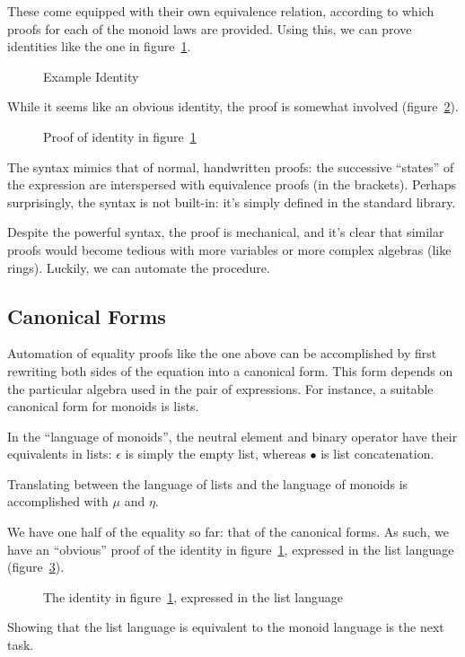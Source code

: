 \documentclass[draft, twocolumn]{article}
\begin{document}
These come equipped with their own equivalence relation, according to which
proofs for each of the monoid laws are provided. Using this, we can prove
identities like the one in figure~\ref{mon-ident}.
\begin{figure}[h]
  \caption{Example Identity}
  \label{mon-ident}
\end{figure}

While it seems like an obvious identity, the proof is somewhat involved
(figure~\ref{mon-proof}).
\begin{figure}[!h]
  \caption{Proof of identity in figure~\ref{mon-ident}}
  \label{mon-proof}
\end{figure}

The syntax mimics that of normal, handwritten proofs: the successive ``states''
of the expression are interspersed with equivalence proofs (in the brackets).
Perhaps surprisingly, the syntax is not built-in: it's simply defined in the
standard library.

Despite the powerful syntax, the proof is mechanical, and it's clear that
similar proofs would become tedious with more variables or more complex algebras
(like rings). Luckily, we can automate the procedure.
\subsection{Canonical Forms}
Automation of equality proofs like the one above can be accomplished by first
rewriting both sides of the equation into a canonical form. This form depends on
the particular algebra used in the pair of expressions. For instance, a suitable
canonical form for monoids is lists.

In the ``language of monoids'', the neutral element and binary operator have
their equivalents in lists: \(\epsilon\) is simply the empty list, whereas
\(\bullet\) is list concatenation.

Translating between the language of lists and the language of monoids is
accomplished with \(\mu\) and \(\eta\).

We have one half of the equality so far: that of the canonical forms. As such,
we have an ``obvious'' proof of the identity in figure~\ref{mon-ident},
expressed in the list language (figure~\ref{list-obvious}).
\begin{figure}[!h]
  \caption{The identity in figure~\ref{mon-ident}, expressed in the list
    language}
  \label{list-obvious}
\end{figure}
Showing that the list language is equivalent to the monoid language is the next
task.
\end{document}
